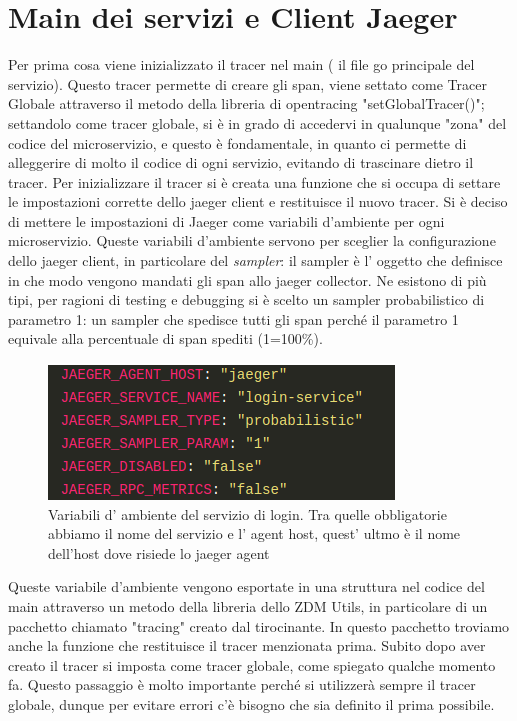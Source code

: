 \documentclass[a4paper,12pt,titlepage,italian,openany]{report}
\begin{document}
\section{Main dei servizi e Client Jaeger}
Per prima cosa viene inizializzato il tracer nel main ( il file go principale del servizio). Questo tracer permette di creare gli span, viene settato come Tracer Globale attraverso il metodo della libreria di opentracing "setGlobalTracer()"; settandolo come tracer globale, si è in grado di accedervi in qualunque "zona" del codice del microservizio, e questo è fondamentale, in quanto ci permette di alleggerire
di molto il codice di ogni servizio, evitando di trascinare dietro il tracer. Per inizializzare il tracer si è creata una funzione che si occupa di settare le impostazioni corrette dello jaeger client e restituisce il nuovo tracer. Si è deciso di mettere le impostazioni
di Jaeger come variabili d'ambiente per ogni microservizio. Queste variabili d'ambiente servono per sceglier la configurazione dello jaeger client, in particolare del \textit{sampler}: il sampler è l' oggetto che definisce in che modo vengono mandati gli span allo jaeger collector. Ne esistono di più tipi, per ragioni di testing e debugging si è scelto un sampler probabilistico
 di parametro 1: un sampler che spedisce tutti gli span perché il parametro 1 equivale alla percentuale di span spediti (1=100\%). 
\begin{figure}[H]
    \includegraphics[scale=0.5]{envvar.png}
    \centering
    \caption{Variabili d' ambiente del servizio di login. Tra quelle obbligatorie abbiamo il nome del servizio e l' agent host, quest' ultmo è il nome dell'host dove risiede lo jaeger agent}
\end{figure}
Queste variabile d'ambiente vengono esportate in una struttura nel codice del main attraverso un metodo della libreria dello ZDM\cite{zdm:1} Utils, in particolare di un pacchetto chiamato "tracing" creato dal tirocinante.
In questo pacchetto troviamo anche la funzione che restituisce il tracer menzionata prima.
Subito dopo aver creato il tracer si imposta come tracer globale, come spiegato qualche momento fa. Questo passaggio è molto importante perché si utilizzerà sempre il tracer globale,
dunque per evitare errori c'è bisogno che sia definito il prima possibile.
\end{document}
